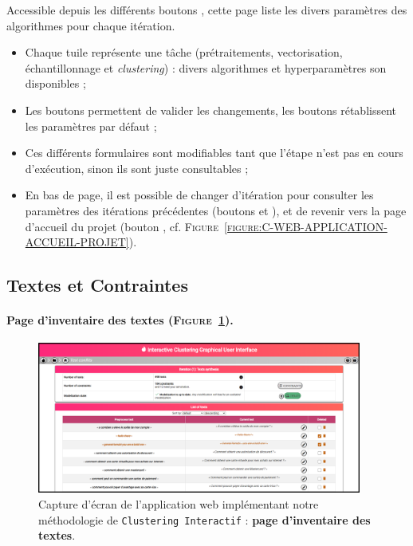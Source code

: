 			Accessible depuis les différents boutons \textguillemets{\faCog}, cette page liste les divers paramètres des algorithmes pour chaque itération.
			\begin{itemize}
				\item Chaque tuile représente une tâche (prétraitements, vectorisation, échantillonnage et \textit{clustering}) : divers algorithmes et hyperparamètres son disponibles ;
				\item Les boutons  permettent de valider les changements, les boutons  rétablissent les paramètres par défaut ;
				\item Ces différents formulaires sont modifiables tant que l'étape n'est pas en cours d'exécution, sinon ils sont juste consultables ;
				\item En bas de page, il est possible de changer d'itération pour consulter les paramètres des itérations précédentes (boutons \textguillemets{\faAngleLeft} et \textguillemets{\faAngleRight}), et de revenir vers la page d'accueil du projet (bouton \textguillemets{\faHome}, cf. \textsc{Figure~\ref{figure:C-WEB-APPLICATION-ACCUEIL-PROJET}}).
			\end{itemize}
	
	
	\newpage
	\subsection{Textes et Contraintes}
	\label{annex:C.2.3-DESCRIPTION-IMPLEMENTATION-INTERACTIVE-CLUSTERING-GUI-DONNEES}
	
		\paragraph{Page d'inventaire des textes (\textsc{Figure~\ref{figure:C-WEB-APPLICATION-INVENTAIRE-TEXTES}}).}
		
			\begin{figure}[H]
				\centering
				\includegraphics[width=0.95\textwidth]{figures/interactive-clustering-application-textes}
				\caption{
					Capture d'écran de l'application web implémentant notre méthodologie de \texttt{Clustering Interactif} : \textbf{page d'inventaire des textes}.
				}
				\label{figure:C-WEB-APPLICATION-INVENTAIRE-TEXTES}
			\end{figure}
			
